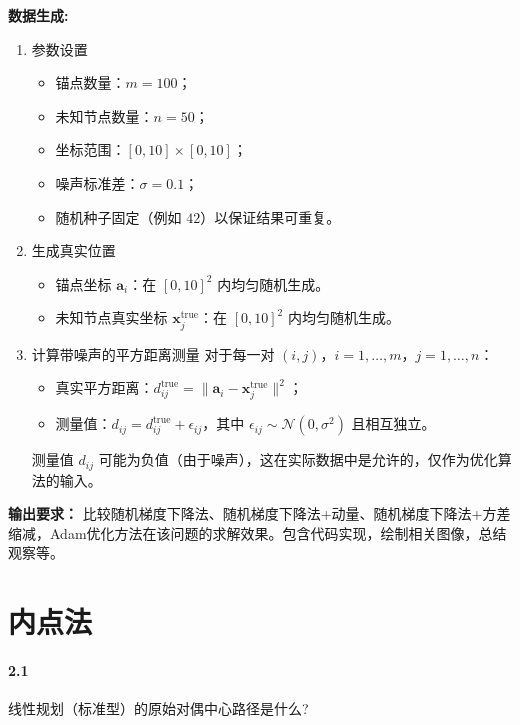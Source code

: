 \documentclass[12pt,a4paper]{article}
\begin{document}
\textbf{数据生成:} 
\begin{enumerate}
    \item 参数设置
\begin{itemize}
    \item 锚点数量：$m = 100$；
    \item 未知节点数量：$n = 50$；
    \item 坐标范围：$[0, 10] \times [0, 10]$；
    \item 噪声标准差：$\sigma = 0.1$；
    \item 随机种子固定（例如 $42$）以保证结果可重复。
\end{itemize}

\item 生成真实位置
\begin{itemize}
    \item 锚点坐标 $\mathbf{a}_i$：在 $[0,10]^2$ 内均匀随机生成。
    \item 未知节点真实坐标 $\mathbf{x}_j^{\text{true}}$：在 $[0,10]^2$ 内均匀随机生成。
\end{itemize}

\item 计算带噪声的平方距离测量
对于每一对 $(i,j)$，$i=1,\dots,m$，$j=1,\dots,n$：
\begin{itemize}
    \item 真实平方距离：$d_{ij}^{\text{true}} = \|\mathbf{a}_i - \mathbf{x}_j^{\text{true}}\|^2$；
    \item 测量值：$d_{ij} = d_{ij}^{\text{true}} + \epsilon_{ij}$，其中 $\epsilon_{ij} \sim \mathcal{N}(0, \sigma^2)$ 且相互独立。
\end{itemize}
测量值 $d_{ij}$ 可能为负值（由于噪声），这在实际数据中是允许的，仅作为优化算法的输入。

\end{enumerate}

\textbf{输出要求：}  比较随机梯度下降法、随机梯度下降法+动量、随机梯度下降法+方差缩减，Adam优化方法在该问题的求解效果。包含代码实现，绘制相关图像，总结观察等。



\section{内点法}

\paragraph{2.1}
线性规划（标准型）的原始对偶中心路径是什么? 
\end{document}
